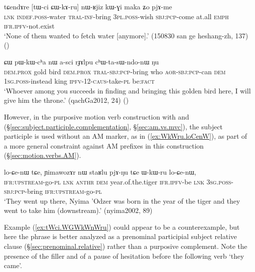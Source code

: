 \begin{exe}
\ex \label{ex:CWkAru.nWRjiz}
\gll  tɕendɤre [tɯ-ci ɕɯ-kɤ-ru] nɯ-ʁjiz kɯ-ɣi maka ʑo pjɤ-me \\
\textsc{lnk} \textsc{indef}.\textsc{poss}-water \textsc{tral}-\textsc{inf}-bring \textsc{3pl}.\textsc{poss}-wish \textsc{sbj}:\textsc{pcp}-come at.all \textsc{emph} \textsc{ifr}.\textsc{ipfv}-not.exist \\
\glt `None of them wanted to fetch water [anymore].' (150830 san ge heshang-zh, 137)
()
\end{exe}

\begin{exe}
\ex \label{ex:CWkWru.pWkWcha}
 ɕɯ pɯ-kɯ-cʰa nɯ a-sci rɟɤlpu cʰɯ-ta-sɯ-ndo-nɯ ŋu  \\
\textsc{dem}.\textsc{prox} gold bird \textsc{dem}.\textsc{prox} \textsc{tral}-\textsc{sbj}:\textsc{pcp}-bring who \textsc{aor}-\textsc{sbj}:\textsc{pcp}-can \textsc{dem} \textsc{1sg}.\textsc{poss}-instead king \textsc{ipfv}-1\fl{}2-\textsc{caus}-take-\textsc{pl} be:\textsc{fact} \\
\glt `Whoever among you succeeds in finding and bringing this golden bird here, I will give him the throne.' (qachGa2012, 24)
()
\end{exe}

 
However, in the purposive motion verb construction with  and  (§\ref{sec:subject.participle.complementation}, §\ref{sec:am.vs.mvc}), the subject participle  is used without an AM marker, as in (\ref{ex:WkWru.loCenW}), as part of a more general constraint against AM prefixes in this construction (§\ref{sec:motion.verbs.AM}).

\begin{exe}
\ex \label{ex:WkWru.loCenW}
\gll  lo-ɕe-nɯ tɕe,  ɲimawozɤr nɯ staʁlu pjɤ-ŋu tɕe ɯ-kɯ-ru lo-ɕe-nɯ,  \\
\textsc{ifr}:\textsc{upstream}-go-\textsc{pl} \textsc{lnk}  \textsc{anthr} \textsc{dem} year.of.the.tiger \textsc{ifr}.\textsc{ipfv}-be \textsc{lnk} \textsc{3sg}.\textsc{poss}-\textsc{sbj}:\textsc{pcp}-bring \textsc{ifr}:\textsc{upstream}-go-\textsc{pl} \\
\glt `They went up there, Nyima 'Odzer was born in the year of the tiger and they went to take him (downstream).' (nyima2002, 89)
\end{exe}

Example (\ref{ex:tWci.WGWkWnWru}) could appear to be a counterexample, but here the phrase  is better analyzed as a prenominal participial subject relative clause (§\ref{sec:prenominal.relative}) rather than a purposive complement. Note the presence of the filler  and of a pause of hesitation before the following verb  `they came'.

